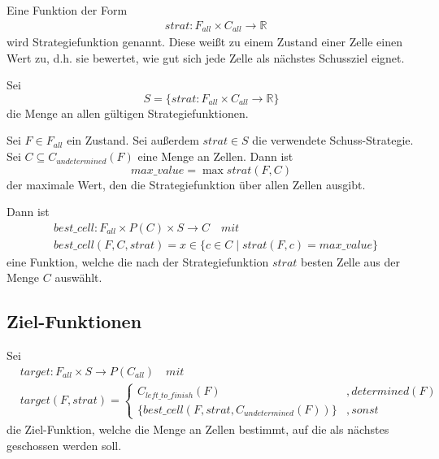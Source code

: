 \documentclass[a4paper,12pt]{llncs}
\numberwithin{equation}{section}
\begin{document}
\begin{definition}
Eine Funktion der Form
\begin{align}
&strat:F_{all} \times C_{all} \rightarrow \mathbb{R} \nonumber
\end{align}
wird Strategiefunktion genannt. Diese weißt zu einem Zustand einer Zelle einen Wert zu, d.h. sie bewertet, wie gut sich jede Zelle als nächstes Schussziel eignet.
\end{definition}

\begin{definition}
Sei
\[
S=\{ strat:F_{all} \times C_{all} \rightarrow \mathbb{R} \}
\]
die Menge an allen gültigen Strategiefunktionen.
\end{definition}

\begin{definition}
Sei $F\in F_{all}$ ein Zustand.
Sei außerdem $strat \in S$ die verwendete Schuss-Strategie.
Sei $C \subseteq C_{undetermined}(F)$ eine Menge an Zellen.
Dann ist
\[
max\_value=\max strat(F, C)
\]
der maximale Wert, den die Strategiefunktion über allen Zellen ausgibt.

Dann ist
\begin{align}
&best\_cell:F_{all} \times P(C) \times S \rightarrow C \quad mit \nonumber\\
&best\_cell(F, C, strat)=x \in \{c \in C \mid strat(F, c) = max\_value\}
\nonumber
\end{align}
eine Funktion, welche die nach der Strategiefunktion $strat$ besten Zelle aus der Menge $C$ auswählt.
\end{definition}

\subsection{Ziel-Funktionen}

\begin{definition}
Sei
\begin{align}
&target:F_{all} \times S \rightarrow P(C_{all}) \quad mit \nonumber\\
&target(F,strat)=
\begin{cases}
C_{left\_to\_finish}(F)&, determined(F) \\
\{best\_cell(F, strat, C_{undetermined}(F))\}&, sonst
\end{cases}
\nonumber
\end{align}
die Ziel-Funktion, welche die Menge an Zellen bestimmt, auf die als nächstes geschossen werden soll.
\end{definition}
\end{document}
